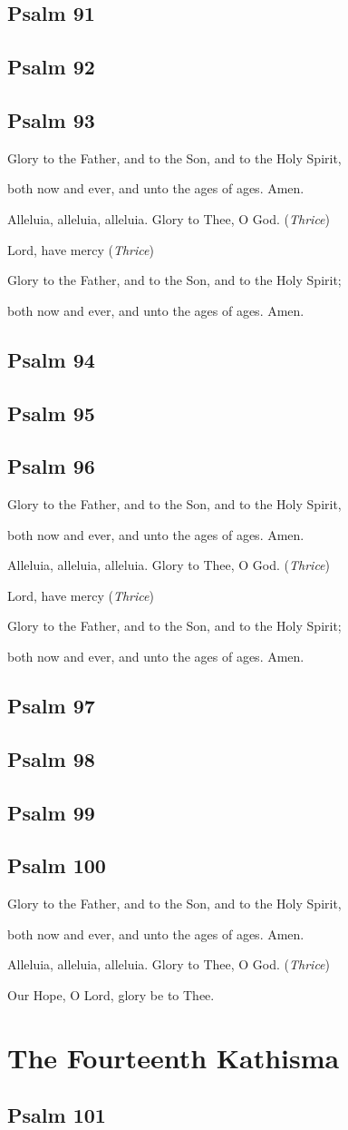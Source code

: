 \documentclass[12pt,openany]{book}
\newcommand{\kathismabreak}{
  \medskip
  \begin{center}
  \begin{footnotesize}
  Glory to the Father, and to the Son, and to the Holy Spirit,
  
  both now and ever, and unto the ages of ages. Amen.

  Alleluia, alleluia, alleluia. Glory to Thee, O God. (\textit{Thrice})

  Lord, have mercy (\textit{Thrice})

  Glory to the Father, and to the Son, and to the Holy Spirit;
  
  both now and ever, and unto the ages of ages. Amen.
  \end{footnotesize}
  \end{center}
  \smallbreak
}
\newcommand{\kathismaend}{
  \medskip
  \begin{center}
  \begin{footnotesize}
  Glory to the Father, and to the Son, and to the Holy Spirit,
  
  both now and ever, and unto the ages of ages. Amen.

  Alleluia, alleluia, alleluia. Glory to Thee, O God. (\textit{Thrice})

  Our Hope, O Lord, glory be to Thee.
  \end{footnotesize}
  \end{center}
  \smallbreak
}
\begin{document}
\section{Psalm 91}

\smallskip
\section{Psalm 92}

\smallskip
\section{Psalm 93}


\kathismabreak
\smallskip
\section{Psalm 94}

\smallskip
\section{Psalm 95}

\smallskip
\section{Psalm 96}


\kathismabreak
\smallskip
\section{Psalm 97}

\smallskip
\section{Psalm 98}

\smallskip
\section{Psalm 99}

\smallskip
\section{Psalm 100}


\kathismaend

\chapter*{The Fourteenth Kathisma}
\smallskip
\section{Psalm 101}

\smallskip
\end{document}
